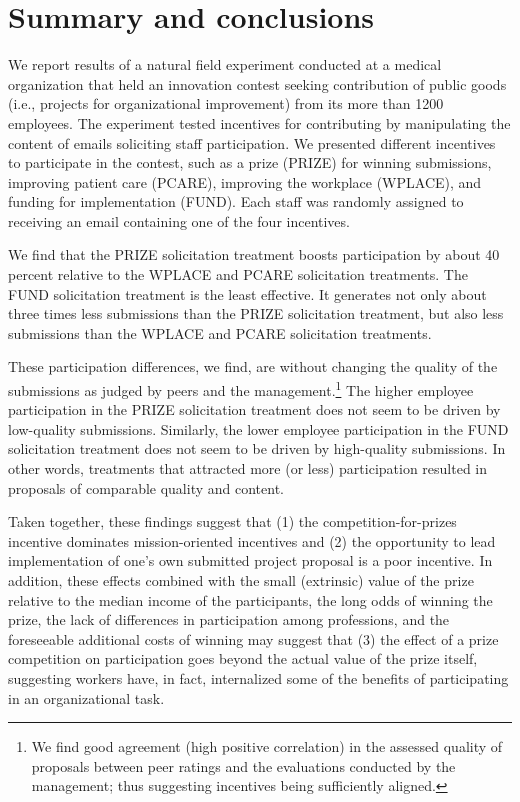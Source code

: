 \documentclass[12pt, titlepage]{article}
\begin{document}
\section{Summary and conclusions}\label{summary-and-conclusions}

We report results of a natural field experiment conducted at a medical
organization that held an innovation contest seeking contribution of
public goods (i.e., projects for organizational improvement) from its
more than 1200 employees. The experiment tested incentives for
contributing by manipulating the content of emails soliciting staff
participation. We presented different incentives to participate in the
contest, such as a prize (PRIZE) for winning submissions, improving
patient care (PCARE), improving the workplace (WPLACE), and funding for
implementation (FUND). Each staff was randomly assigned to receiving an
email containing one of the four incentives.

We find that the PRIZE solicitation treatment boosts participation by
about 40 percent relative to the WPLACE and PCARE solicitation
treatments. The FUND solicitation treatment is the least effective. It
generates not only about three times less submissions than the PRIZE
solicitation treatment, but also less submissions than the WPLACE and
PCARE solicitation treatments.

These participation differences, we find, are without changing the
quality of the submissions as judged by peers and the
management.\footnote{We find good agreement (high positive correlation)
  in the assessed quality of proposals between peer ratings and the
  evaluations conducted by the management; thus suggesting incentives
  being sufficiently aligned.} The higher employee participation in the
PRIZE solicitation treatment does not seem to be driven by low-quality
submissions. Similarly, the lower employee participation in the FUND
solicitation treatment does not seem to be driven by high-quality
submissions. In other words, treatments that attracted more (or less)
participation resulted in proposals of comparable quality and content.

Taken together, these findings suggest that (1) the
competition-for-prizes incentive dominates mission-oriented incentives
and (2) the opportunity to lead implementation of one's own submitted
project proposal is a poor incentive. In addition, these effects
combined with the small (extrinsic) value of the prize relative to the
median income of the participants, the long odds of winning the prize,
the lack of differences in participation among professions, and the
foreseeable additional costs of winning may suggest that (3) the effect
of a prize competition on participation goes beyond the actual value of
the prize itself, suggesting workers have, in fact, internalized some of
the benefits of participating in an organizational task.
\end{document}
